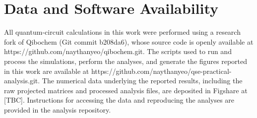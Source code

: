 \documentclass[letterpaper]{article}
\begin{document}
\section*{Data and Software Availability}
All quantum-circuit calculations in this work were performed using a research fork of Qibochem (Git commit b208da6), whose source code is openly available at https://github.com/naythanyeo/qibochem.git. 
The scripts used to run and process the simulations, perform the analyses, and generate the figures reported in this work are available at https://github.com/naythanyeo/qse-practical-analysis.git. 
The numerical data underlying the reported results, including the raw projected matrices and processed analysis files, are deposited in Figshare at [TBC].
Instructions for accessing the data and reproducing the analyses are provided in the analysis repository.

\clearpage
\printbibliography
\end{document}
